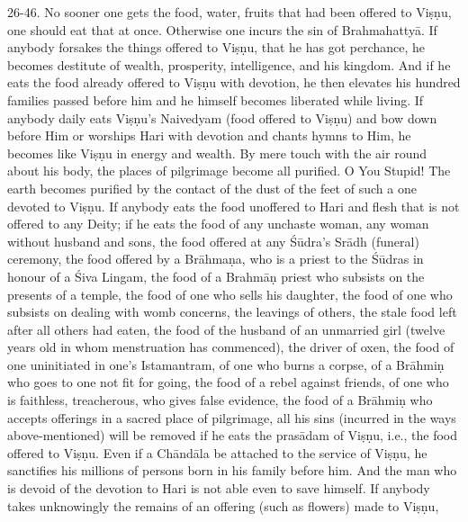 26-46. No sooner one gets the food, water, fruits that had been offered to Vi\d{s}\d{n}u, one should eat that at once. Otherwise one incurs the sin of Brahmahatty\=a. If anybody forsakes the things offered to Vi\d{s}\d{n}u, that he has got perchance, he becomes destitute of wealth, prosperity, intelligence, and his kingdom. And if he eats the food already offered to Vi\d{s}\d{n}u with devotion, he then elevates his hundred families passed before him and he himself becomes liberated while living. If anybody daily eats Vi\d{s}\d{n}u's Naivedyam (food offered to Vi\d{s}\d{n}u) and bow down before Him or worships Hari with devotion and chants hymns to Him, he becomes like Vi\d{s}\d{n}u in energy and wealth. By mere touch with the air round about his body, the places of pilgrimage become all purified. O You Stupid! The earth becomes purified by the contact of the dust of the feet of such a one devoted to Vi\d{s}\d{n}u. If anybody eats the food unoffered to Hari and flesh that is not offered to any Deity; if he eats the food of any unchaste woman, any woman without husband and sons, the food offered at any \'S\=udra's Sr\=adh (funeral) ceremony, the food offered by a Br\=ahma\d{n}a, who is a priest to the \'S\=udras in honour of a \'Siva Lingam, the food of a Brahm\=a\d{n} priest who subsists on the presents of a temple, the food of one who sells his daughter, the food of one who subsists on dealing with womb concerns, the leavings of others, the stale food left after all others had eaten, the food of the husband of an unmarried girl (twelve years old in whom menstruation has commenced), the driver of oxen, the food of one uninitiated in one's Istamantram, of one who burns a corpse, of a Br\=ahmi\d{n} who goes to one not fit for going, the food of a rebel against friends, of one who is faithless, treacherous, who gives false evidence, the food of a Br\=ahmi\d{n} who accepts offerings in a sacred place of pilgrimage, all his sins (incurred in the ways above-mentioned) will be removed if he eats the pras\=adam of Vi\d{s}\d{n}u, i.e., the food offered to Vi\d{s}\d{n}u. Even if a Ch\=and\=ala be attached to the service of Vi\d{s}\d{n}u, he sanctifies his millions of persons born in his family before him. And the man who is devoid of the devotion to Hari is not able even to save himself. If anybody takes unknowingly the remains of an offering (such as flowers) made to Vi\d{s}\d{n}u,

